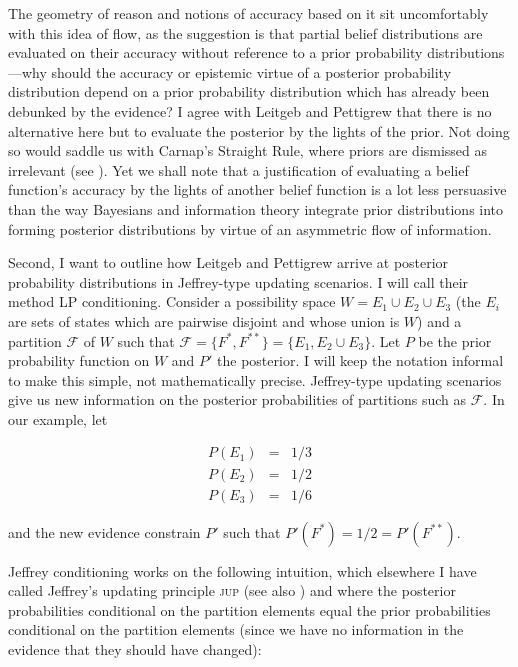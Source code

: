 \documentclass[11pt]{article}
\begin{document}
The geometry of reason and notions of accuracy based on it sit
uncomfortably with this idea of flow, as the suggestion is that
partial belief distributions are evaluated on their accuracy without
reference to a prior probability distributions---why should the
accuracy or epistemic virtue of a posterior probability distribution
depend on a prior probability distribution which has already been
debunked by the evidence? I agree with Leitgeb and Pettigrew that
there is no alternative here but to evaluate the posterior by the
lights of the prior. Not doing so would saddle us with Carnap's
Straight Rule, where priors are dismissed as irrelevant (see
). Yet we shall note that a justification of
evaluating a belief function's accuracy by the lights of another
belief function is a lot less persuasive than the way Bayesians and
information theory integrate prior distributions into forming
posterior distributions by virtue of an asymmetric flow of
information.

Second, I want to outline how Leitgeb and Pettigrew arrive at
posterior probability distributions in Jeffrey-type updating
scenarios. I will call their method LP conditioning. Consider a
possibility space $W=E_{1}\cup{}E_{2}\cup{}E_{3}$ (the $E_{i}$ are
sets of states which are pairwise disjoint and whose union is $W$) and
a partition $\mathcal{F}$ of $W$ such that
$\mathcal{F}=\{F^{*},F^{**}\}=\{E_{1},E_{2}\cup{}E_{3}\}$. Let
$P$ be the prior probability function on $W$ and $P'$ the posterior. I
will keep the notation informal to make this simple, not
mathematically precise. Jeffrey-type updating scenarios give us new
information on the posterior probabilities of partitions such as
$\mathcal{F}$. In our example, let

\begin{equation}
  \label{eq:priors}
  \begin{array}{rcl}
    P(E_{1})&=&1/3 \\
    P(E_{2})&=&1/2 \\
    P(E_{3})&=&1/6
  \end{array}
\end{equation}

and the new evidence constrain $P'$ such that
$P'(F^{*})=1/2=P'(F^{**})$.

Jeffrey conditioning works on the following intuition, which elsewhere
I have called Jeffrey's updating principle \textsc{jup} (see also
) and where the posterior probabilities
conditional on the partition elements equal the prior probabilities
conditional on the partition elements (since we have no information in
the evidence that they should have changed):
\end{document}
